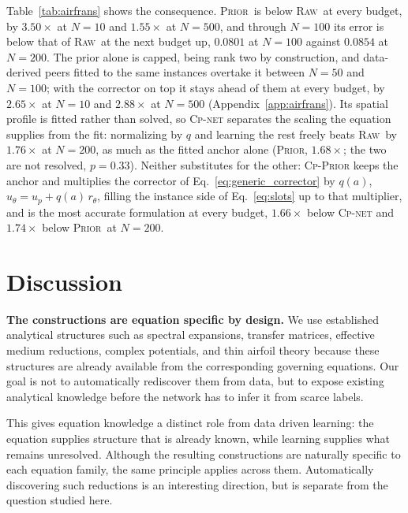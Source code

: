 \documentclass{article}
\newcommand{\armraw}{\textsc{Raw}}
\newcommand{\armprior}{\textsc{Prior}}
\begin{document}
Table~\ref{tab:airfrans} shows the consequence. \armprior\ is below \armraw\ at every budget, by $3.50\times$ at $N{=}10$ and $1.55\times$ at $N{=}500$, and through $N{=}100$ its error is below that of \armraw\ at the next budget up, $0.0801$ at $N{=}100$ against $0.0854$ at $N{=}200$. The prior alone is capped, being rank two by construction, and data-derived peers fitted to the same instances overtake it between $N{=}50$ and $N{=}100$; with the corrector on top it stays ahead of them at every budget, by $2.65\times$ at $N{=}10$ and $2.88\times$ at $N{=}500$ (Appendix~\ref{app:airfrans}). Its spatial profile is fitted rather than solved, so \textsc{Cp-net} separates the scaling the equation supplies from the fit: normalizing by $q$ and learning the rest freely beats \armraw\ by $1.76\times$ at $N{=}200$, as much as the fitted anchor alone (\armprior, $1.68\times$; the two are not resolved, $p=0.33$). Neither substitutes for the other: \textsc{Cp-Prior} keeps the anchor and multiplies the corrector of Eq.~\ref{eq:generic_corrector} by $q(a)$, $\hat u_\theta=u_p+q(a)\,r_\theta$, filling the instance side of Eq.~\ref{eq:slots} up to that multiplier, and is the most accurate formulation at every budget, $1.66\times$ below \textsc{Cp-net} and $1.74\times$ below \armprior\ at $N{=}200$.

\section{Discussion}
\label{sec:limitations}
\vspace{-3mm}

\textbf{The constructions are equation specific by design.} We use established analytical structures such as spectral expansions, transfer matrices, effective medium reductions, complex potentials, and thin airfoil theory because these structures are already available from the corresponding governing equations. Our goal is not to automatically rediscover them from data, but to expose existing analytical knowledge before the network has to infer it from scarce labels.

This gives equation knowledge a distinct role from data driven learning: the equation supplies structure that is already known, while learning supplies what remains unresolved. Although the resulting constructions are naturally specific to each equation family, the same principle applies across them. Automatically discovering such reductions is an interesting direction, but is separate from the question studied here.
\end{document}
